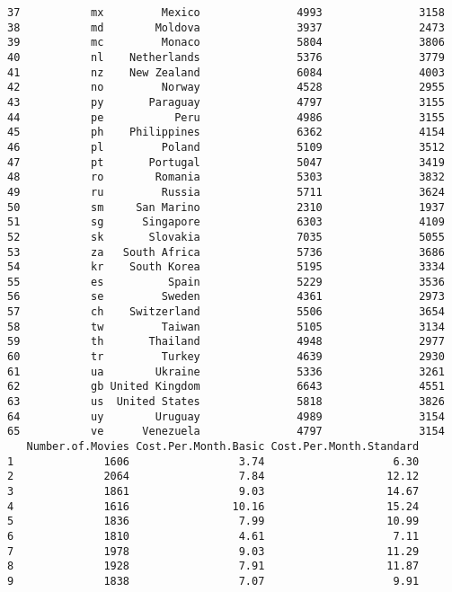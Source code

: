 \documentclass[
]{article}
\begin{document}
\begin{verbatim}
37           mx         Mexico               4993               3158
38           md        Moldova               3937               2473
39           mc         Monaco               5804               3806
40           nl    Netherlands               5376               3779
41           nz    New Zealand               6084               4003
42           no         Norway               4528               2955
43           py       Paraguay               4797               3155
44           pe           Peru               4986               3155
45           ph    Philippines               6362               4154
46           pl         Poland               5109               3512
47           pt       Portugal               5047               3419
48           ro        Romania               5303               3832
49           ru         Russia               5711               3624
50           sm     San Marino               2310               1937
51           sg      Singapore               6303               4109
52           sk       Slovakia               7035               5055
53           za   South Africa               5736               3686
54           kr    South Korea               5195               3334
55           es          Spain               5229               3536
56           se         Sweden               4361               2973
57           ch    Switzerland               5506               3654
58           tw         Taiwan               5105               3134
59           th       Thailand               4948               2977
60           tr         Turkey               4639               2930
61           ua        Ukraine               5336               3261
62           gb United Kingdom               6643               4551
63           us  United States               5818               3826
64           uy        Uruguay               4989               3154
65           ve      Venezuela               4797               3154
   Number.of.Movies Cost.Per.Month.Basic Cost.Per.Month.Standard
1              1606                 3.74                    6.30
2              2064                 7.84                   12.12
3              1861                 9.03                   14.67
4              1616                10.16                   15.24
5              1836                 7.99                   10.99
6              1810                 4.61                    7.11
7              1978                 9.03                   11.29
8              1928                 7.91                   11.87
9              1838                 7.07                    9.91

\end{verbatim}
\end{document}
